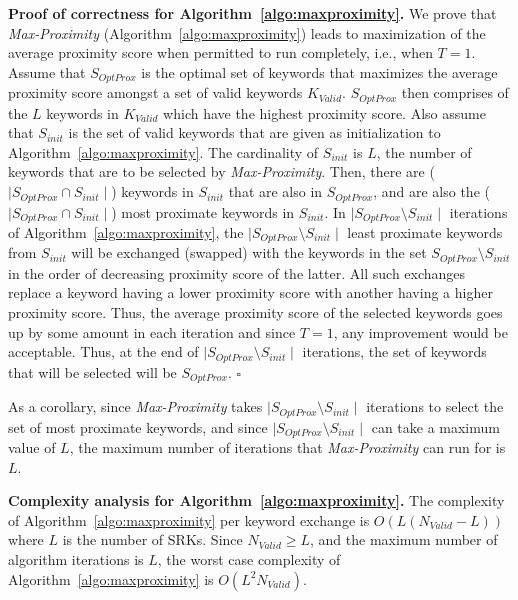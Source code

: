 \textbf{Proof of correctness for Algorithm~\ref{algo:maxproximity}. } 
We prove that \textit{Max-Proximity} (Algorithm~\ref{algo:maxproximity}) leads to maximization of the average proximity score when permitted to run completely, i.e., when $T=1$. Assume that $S_{OptProx}$ is the optimal set of keywords that maximizes the average proximity score amongst a set of valid keywords $K_{Valid}$. $S_{OptProx}$ then comprises of the $L$ keywords in $K_{Valid}$ which have the highest proximity score. Also assume that $S_{init}$ is the set of valid keywords that are given as initialization to Algorithm~\ref{algo:maxproximity}. The cardinality of $S_{init}$ is $L$, the number of keywords that are to be selected by \textit{Max-Proximity}. Then, there are ($\mid S_{OptProx} \cap S_{init} \mid$) keywords in $S_{init}$ that are also in $S_{OptProx}$, and are also the ($\mid S_{OptProx} \cap S_{init} \mid$) most proximate keywords in $S_{init}$. In $\mid S_{OptProx} \setminus S_{init}  \mid$ iterations of Algorithm~\ref{algo:maxproximity}, the  $\mid S_{OptProx} \setminus S_{init} \mid$ least proximate keywords from $S_{init}$ will be exchanged (swapped) with the keywords in the set $S_{OptProx} \setminus S_{init}$ in the order of decreasing proximity score of the latter. All such exchanges replace a keyword having a lower proximity score with another having a higher proximity score. Thus, the average proximity score of the selected keywords goes up by some amount in each iteration and since $T=1$, any improvement would be acceptable. Thus, at the end of $\mid S_{OptProx} \setminus S_{init} \mid$ iterations, the set of keywords that will be selected will be $S_{OptProx}$. \hfill $\square$

As a corollary, since \textit{Max-Proximity} takes $\mid S_{OptProx} \setminus S_{init} \mid$ iterations to select the set of most proximate keywords, and since  $\mid S_{OptProx} \setminus S_{init} \mid$ can take a maximum value of $L$, the maximum number of iterations that \textit{Max-Proximity} can run for is $L$. 

\textbf{Complexity analysis for Algorithm~\ref{algo:maxproximity}.} The complexity of Algorithm~\ref{algo:maxproximity} per keyword exchange is $O(L (N_{Valid} -L))$ where $L$ is the number of SRKs. Since $N_{Valid} \ge L$, and the maximum number of algorithm iterations is $L$, the worst case complexity of Algorithm~\ref{algo:maxproximity} is $O(L^2 N_{Valid})$. 


